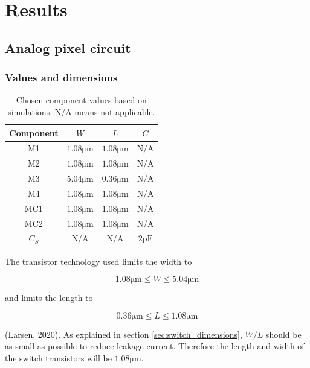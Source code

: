 \section{Results}
\subsection{Analog pixel circuit}
\subsubsection{Values and dimensions}

\begin{table}
    \centering
    \caption{Chosen component values based on simulations. N/A means not applicable.}
    \begin{tabular}{|c|c|c|c|}
        \hline
        Component & $W$ & $L$ & $C$ \\
        \hline
        M1 & $1.08 \mathrm{\mu m}$ & $1.08 \mathrm{\mu m}$ & N/A \\
        \hline
        M2 & $1.08 \mathrm{\mu m}$ & $1.08 \mathrm{\mu m}$ & N/A \\
        \hline
        M3 & $5.04 \mathrm{\mu m}$ & $0.36 \mathrm{\mu m}$ & N/A \\
        \hline
        M4 & $1.08 \mathrm{\mu m}$ & $1.08 \mathrm{\mu m}$ & N/A \\
        \hline
        MC1 & $1.08 \mathrm{\mu m}$ & $1.08 \mathrm{\mu m}$ & N/A \\
        \hline
        MC2 & $1.08 \mathrm{\mu m}$ & $1.08 \mathrm{\mu m}$ & N/A \\
        \hline
        $C_S$ & N/A & N/A & $2 \mathrm{pF}$ \\
        \hline
    \end{tabular}
\end{table}

The transistor technology used limits the width to 

\begin{equation}
    \label{eq:limitsW}
    1.08 \mathrm{\mu m} \leq W \leq 5.04 \mathrm{\mu m}
\end{equation}

and limits the length to

\begin{equation}
    \label{eq:limitsL}
    0.36 \mathrm{\mu m} \leq L \leq 1.08 \mathrm{\mu m}
\end{equation}

(Larsen, 2020). As explained in section \ref{sec:switch_dimensions}, $W/L$ should be as small as possible to reduce leakage current. Therefore the length and width of the switch transistors will be $1.08\mathrm{\mu m}$.

